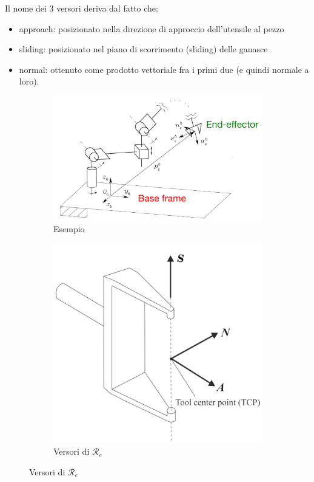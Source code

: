 Il nome dei 3 versori deriva dal fatto che:
\begin{itemize}
	\item approach: posizionato nella direzione di approccio dell’utensile al pezzo
	\item sliding: posizionato nel piano di scorrimento (sliding) delle ganasce
	\item normal: ottenuto come prodotto vettoriale fra i primi due (e quindi normale a loro).
\end{itemize}

\begin{figure}[H]
	\begin{subfigure}{0.65\linewidth}
		\centering
		\includegraphics[width=0.9\linewidth]{images/kinematics_2}
		\caption{Esempio}
		\label{fig:kinematics2}
	\end{subfigure}
	\begin{subfigure}{0.3\linewidth}
		\centering
		\includegraphics[width=1\linewidth]{images/kinematics_3}
		\caption{Versori di $\mathcal{R}_e$}
		\label{fig:kinematics3}
	\end{subfigure}
\end{figure}


